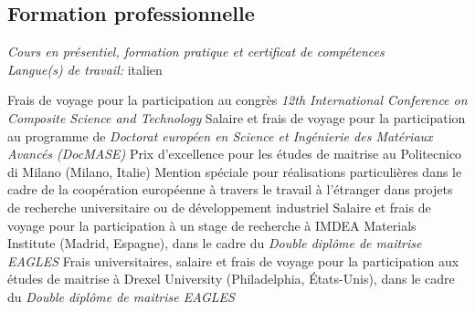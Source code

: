 \documentclass[
  a4paper, 
]{fortysecondscv}
\begin{document}
\subsection{Formation professionnelle}
\begin{cvtable}
		{{\small\emph{\small Cours en pr\'esentiel, formation pratique et certificat de comp\'etences}\\\textit{\small Langue(s) de travail:} italien}}
\end{cvtable}


\newpage


\begin{cvtable}
		{{\small Frais de voyage pour la participation au congr\`es \emph{\small 12th International Conference on Composite Science and Technology}}}
		{{\small Salaire et frais de voyage pour la participation au programme de \emph{\small Doctorat europ\'een en Science et Ing\'enierie des Mat\'eriaux Avanc\'es (DocMASE)}}}
		{{\small Prix d'excellence pour les \'etudes de maitrise au Politecnico di Milano (Milano, Italie)}}
		{{\small Mention sp\'eciale pour r\'ealisations particuli\`eres dans le cadre de la coop\'eration europ\'eenne \`a travers le travail \`a l'\'etranger dans projets de recherche universitaire ou de d\'eveloppement industriel}}
		{{\small Salaire et frais de voyage pour la participation \`a un stage de recherche \`a IMDEA Materials Institute (Madrid, Espagne), dans le cadre du \emph{\small Double dipl\^ome de maitrise EAGLES}}}
		{{\small Frais universitaires, salaire et frais de voyage pour la participation aux \'etudes de maitrise \`a Drexel University (Philadelphia, \'Etats-Unis), dans le cadre du \emph{\small Double dipl\^ome de maitrise EAGLES}}}

\end{cvtable}
\end{document}
